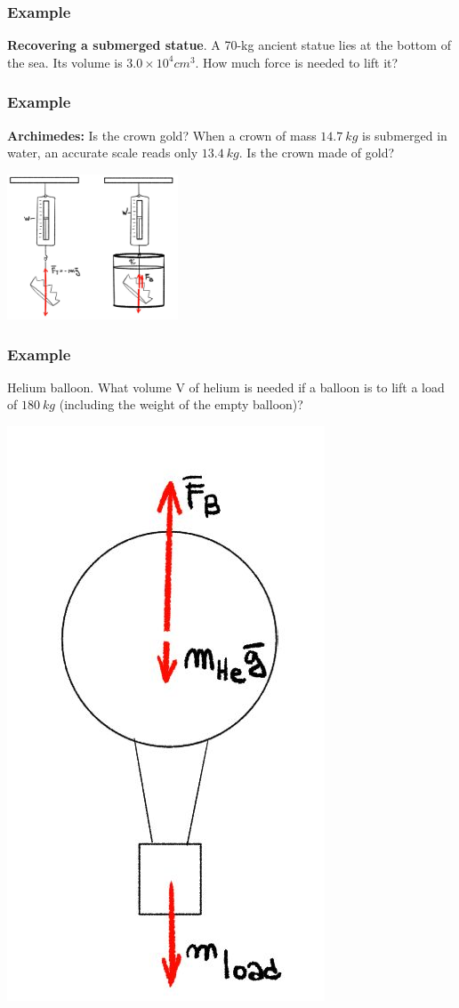 \documentclass[]{beamer}
\begin{document}
\begin{frame}
\frametitle{Example \theexample}

\textbf{Recovering a submerged statue}. A 70-kg ancient statue lies at the bottom of the sea. Its volume is $3.0 \times 10^4cm^3$. How much force is
needed to lift it?

  \end{frame}
\begin{frame}
  

\frametitle{Example \theexample}

\textbf{Archimedes:} Is the crown gold? When a crown of mass $14.7~kg$
is submerged in water, an accurate scale reads only $13.4~kg$. Is the crown made of gold?

  \begin{center}
  \includegraphics[height=1.7in]{images2/arquimedes.jpg}
\end{center}

  \end{frame}




\begin{frame}
\frametitle{Example \theexample}

Helium balloon. What volume V of helium is needed if a balloon is to lift a load of $180~kg$ (including the weight of the empty balloon)?


  \begin{center}
  \includegraphics[height=2.in]{images2/baloom.jpg}
\end{center}

  \end{frame}
\end{document}
